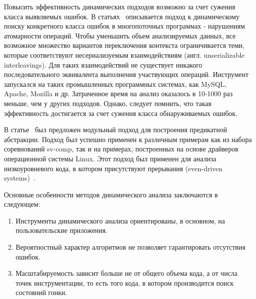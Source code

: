 Повысить эффективность динамических подходов возможно за счет сужения класса выявляемых ошибок.
В статьях~\cite{Park:2009:ASPLOS,Park:2009:SIGARCH,Park:2009} описывается подход к динамическому поиску конкретного класса ошибок в многопоточных программах - нарушениям атомарности операций.
Чтобы уменьшить объем анализируемых данных, все возможное множество вариантов переключения контекста ограничивается теми, которые соответствуют несериализуемым взаимодействиям (англ. unserializable interleavings).
Для таких взаимодействий не существует никакого последовательного эквивалента выполнения участвующих операций.
Инструмент запускался на таких промышленных программных системах, как MySQL, Apache, Mozilla и др.
Затраченное время на анализ оказалось в 10-1000 раз меньше, чем у других подходов. 
Однако, следует помнить, что такая эффективность достигается за счет сужения класса обнаруживаемых ошибок.

В статье~\cite{Kusano:2016:FCT} был предложен модульный подход для построения предикатной абстракции.
Подход был успешно применен к различным примерам как из набора соревнований sv-comp, так и на примерах, построенных на основе драйверов операционной системы Linux.
Этот подход был применен для анализа низкоуровневого кода, в котором присутствуют прерывания (even-driven systems)~\cite{Sung:2017}.

Основные особенности методов динамического анализа заключаются в следующем:
\begin{enumerate}
\item Инструменты динамического анализа ориентированы, в основном, на пользовательские приложения. 
\item Вероятностный характер алгоритмов не позволяет гарантировать отсутствия ошибок.
\item Масштабируемость зависит больше не от общего объема кода, а от числа точек инструментации, то есть того кода, в котором производится поиск состояний гонки. 

\end{enumerate}

